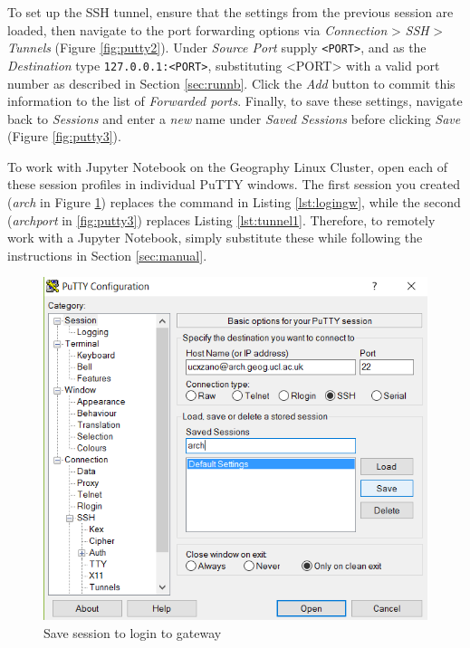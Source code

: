 \documentclass[a4paper]{article}
\begin{document}
To set up the SSH tunnel, ensure that the settings from the previous session are loaded, then navigate to the port forwarding options via \emph{Connection} \textgreater{} \emph{SSH} \textgreater{} \emph{Tunnels} (Figure \ref{fig:putty2}). 
Under \emph{Source Port} supply \texttt{\textless{}PORT\textgreater{}}, and as the \emph{Destination} type \texttt{127.0.0.1:\textless{}PORT\textgreater{}}, substituting \textless{}PORT\textgreater{} with a valid port number as described in Section \ref{sec:runnb}.
Click the \emph{Add} button to commit this information to the list of \emph{Forwarded ports}.
Finally, to save these settings, navigate back to \emph{Sessions} and enter a \emph{new} name under \emph{Saved Sessions} before clicking \emph{Save} (Figure \ref{fig:putty3}).

To work with Jupyter Notebook on the Geography Linux Cluster, open each of these session profiles in individual PuTTY windows.
The first session you created (\emph{arch} in Figure \ref{fig:putty1}) replaces the command in Listing \ref{lst:logingw}, while the second (\emph{archport} in \ref{fig:putty3}) replaces Listing \ref{lst:tunnel1}.
Therefore, to remotely work with a Jupyter Notebook, simply substitute these while following the instructions in Section \ref{sec:manual}.


\begin{figure}[p]
  \centering
    \includegraphics[width=\textwidth]{figures/putty1_save_login_session.png}
  \caption{Save session to login to gateway}
  \label{fig:putty1}
\end{figure}
\end{document}
